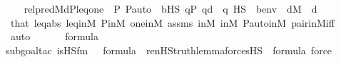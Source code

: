 \begin{isabellebody}
\isanewline
\ \ \isamarkupfalse%
\ {\isachardoublequoteopen}{\isacharquery}{\kern0pt}rel{\isacharunderscore}{\kern0pt}pred{\isacharparenleft}{\kern0pt}M{\isacharcomma}{\kern0pt}d{\isacharcomma}{\kern0pt}P{\isacharcomma}{\kern0pt}leq{\isacharcomma}{\kern0pt}one{\isacharcomma}{\kern0pt}{\isasymlangle}{\isasymF}{\isacharcomma}{\kern0pt}\ {\isasymG}{\isacharcomma}{\kern0pt}\ P{\isacharcomma}{\kern0pt}\ P{\isacharunderscore}{\kern0pt}auto{\isasymrangle}{\isacharparenright}{\kern0pt}\ {\isasymlongleftrightarrow}\ {\isacharparenleft}{\kern0pt}{\isasymexists}b{\isasymin}HS{\isachardot}{\kern0pt}\ {\isasymforall}q{\isasymin}P{\isachardot}{\kern0pt}\ q{\isasympreceq}d\ {\isasymlongrightarrow}\ {\isasymnot}{\isacharparenleft}{\kern0pt}q\ {\isasymtturnstile}HS\ {\isasymphi}\ {\isacharparenleft}{\kern0pt}{\isacharbrackleft}{\kern0pt}b{\isacharbrackright}{\kern0pt}{\isacharat}{\kern0pt}env{\isacharparenright}{\kern0pt}{\isacharparenright}{\kern0pt}{\isacharparenright}{\kern0pt}{\isachardoublequoteclose}\ \ {\isachardoublequoteopen}d{\isasymin}M{\isachardoublequoteclose}\ \ d\isanewline
\ \ \ \ \isamarkupfalse%
\ that\ leq{\isacharunderscore}{\kern0pt}abs\ leq{\isacharunderscore}{\kern0pt}in{\isacharunderscore}{\kern0pt}M\ P{\isacharunderscore}{\kern0pt}in{\isacharunderscore}{\kern0pt}M\ one{\isacharunderscore}{\kern0pt}in{\isacharunderscore}{\kern0pt}M\ assms\ {\isasymF}{\isacharunderscore}{\kern0pt}in{\isacharunderscore}{\kern0pt}M\ {\isasymG}{\isacharunderscore}{\kern0pt}in{\isacharunderscore}{\kern0pt}M\ P{\isacharunderscore}{\kern0pt}auto{\isacharunderscore}{\kern0pt}in{\isacharunderscore}{\kern0pt}M\ pair{\isacharunderscore}{\kern0pt}in{\isacharunderscore}{\kern0pt}M{\isacharunderscore}{\kern0pt}iff\ \isanewline
\ \ \ \ \isamarkupfalse%
\ auto\isanewline
\ \ \isamarkupfalse%
\isanewline
\ \ \isamarkupfalse%
\ {\isachardoublequoteopen}{\isacharquery}{\kern0pt}{\isasympsi}{\isasymin}formula{\isachardoublequoteclose}\ \isanewline
\ \ \ \ \isamarkupfalse%
{\isacharparenleft}{\kern0pt}subgoal{\isacharunderscore}{\kern0pt}tac\ {\isachardoublequoteopen}is{\isacharunderscore}{\kern0pt}HS{\isacharunderscore}{\kern0pt}fm{\isacharparenleft}{\kern0pt}{}{\isacharcomma}{\kern0pt}\ {}{\isacharparenright}{\kern0pt}\ {\isasymin}\ formula\ {\isasymand}\ ren{\isacharunderscore}{\kern0pt}HS{\isacharunderscore}{\kern0pt}truth{\isacharunderscore}{\kern0pt}lemma{\isacharparenleft}{\kern0pt}forcesHS{\isacharparenleft}{\kern0pt}{\isasymphi}{\isacharparenright}{\kern0pt}{\isacharparenright}{\kern0pt}\ {\isasymin}\ formula{\isachardoublequoteclose}{\isacharcomma}{\kern0pt}\ force{\isacharparenright}{\kern0pt}\isanewline

\end{isabellebody}
